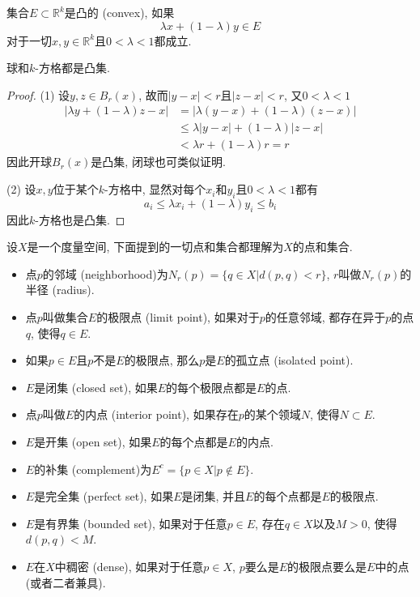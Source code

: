 \documentclass[cn,12pt,math=mtpro2,citestyle=gb7714-2015,bibstyle=gb7714-2015,twocol]{elegantbook}
\newcommand{\R}{\mathbb{R}}
\begin{document}
集合$E\subset\R^k$是凸的 (convex), 如果
$$\lambda x+(1-\lambda)y \in E$$
对于一切$ x,y\in\R^k$且$0<\lambda<1$都成立.
\begin{theorem}
球和$k$-方格都是凸集.
\end{theorem}
\begin{proof}
  (1) 设$y, z\in B_r(x)$, 故而$|y-x|<r$且$|z-x|<r$, 又$0<\lambda<1$
  \begin{align*}
  |\lambda y +(1-\lambda) z-x|&=|\lambda(y-x)+(1-\lambda)(z-x)| \\
  &\leq\lambda|y-x|+(1-\lambda)|z-x| \\
  &<\lambda r+(1-\lambda)r=r
  \end{align*}
  因此开球$B_r(x)$是凸集, 闭球也可类似证明.

  (2) 设$x,y$位于某个$k$-方格中, 显然对每个$x_i$和$y_i$且$0<\lambda<1$都有
  $$a_i\leq \lambda x_i+(1-\lambda) y_i \leq b_i$$
  因此$k$-方格也是凸集.
\end{proof}
\begin{definition}
设$X$是一个度量空间, 下面提到的一切点和集合都理解为$X$的点和集合.
\begin{itemize}
\item 点$p$的邻域 (neighborhood)为$N_r(p)=\{q\in X|d(p,q)<r\}$, $r$叫做$N_r(p)$的半径 (radius).
\item 点$p$叫做集合$E$的极限点 (limit point), 如果对于$p$的任意邻域, 都存在异于$p$的点$q$, 使得$q\in E$.
\item 如果$p\in E$且$p$不是$E$的极限点, 那么$p$是$E$的孤立点 (isolated point).
\item $E$是闭集 (closed set), 如果$E$的每个极限点都是$E$的点.
\item 点$p$叫做$E$的内点 (interior point), 如果存在$p$的某个领域$N$, 使得$N \subset E$.
\item $E$是开集 (open set), 如果$E$的每个点都是$E$的内点.
\item $E$的补集 (complement)为$E^c=\{p\in X|p\notin E\}$.
\item $E$是完全集 (perfect set), 如果$E$是闭集, 并且$E$的每个点都是$E$的极限点.
\item $E$是有界集 (bounded set), 如果对于任意$p \in E$, 存在$q \in X$以及$M>0$, 使得$d(p,q)<M$.
\item $E$在$X$中稠密 (dense), 如果对于任意$p \in X$, $p$要么是$E$的极限点要么是$E$中的点(或者二者兼具).
\end{itemize}
\end{definition}
\end{document}
